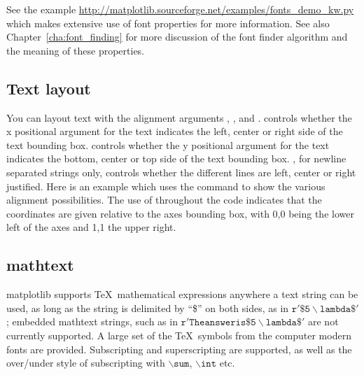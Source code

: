 \documentclass[]{book}
\begin{document}
\noindent See the example
\url{http://matplotlib.sourceforge.net/examples/fonts_demo_kw.py}
which makes extensive use of font properties for more information.
See also Chapter~\ref{cha:font_finding} for more discussion of the
font finder algorithm and the meaning of these properties.

\subsection{Text layout}
\label{sec:text_layout}

You can layout text with the alignment arguments
, , and
.   controls whether
the x positional argument for the text indicates the left, center or
right side of the text bounding box.  controls
whether the y positional argument for the text indicates the bottom,
center or top side of the text bounding box.  ,
for newline separated strings only, controls whether the different
lines are left, center or right justified.  Here is an example which
uses the  command to show the various alignment
possibilities.  The use of  throughout
the code indicates that the coordinates are given relative to the axes
bounding box, with 0,0 being the lower left of the axes and 1,1 the
upper right.







\subsection{mathtext}
\label{sec:mathtext}

matplotlib supports \TeX\ mathematical expressions anywhere a text
string can be used, as long as the string is delimited by ``\$'' on
both sides, as in $\mathtt{r'\$5\backslash lambda\$'}$; embedded
mathtext strings, such as in $\mathtt{r'The answer is \$5\backslash
  lambda\$'}$ are not currently supported. A large set of the \TeX\ 
symbols from the computer modern fonts are provided.  Subscripting and
superscripting are supported, as well as the over/under style of
subscripting with $\mathtt{\backslash sum}$, $\mathtt{\backslash int}$
etc.
\end{document}
